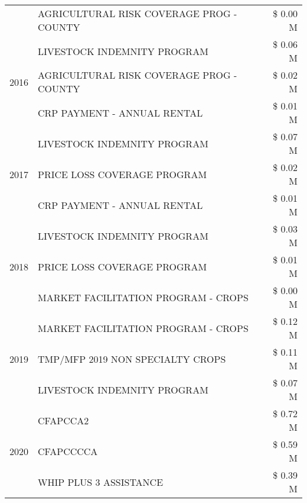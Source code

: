 \begin{tabular}{llr}
 & AGRICULTURAL RISK COVERAGE PROG - COUNTY & \$ 0.00 M \\
\cline{1-3}
\multirow[t]{3}{*}{2016} & LIVESTOCK INDEMNITY PROGRAM & \$ 0.06 M \\
 & AGRICULTURAL RISK COVERAGE PROG - COUNTY & \$ 0.02 M \\
 & CRP PAYMENT - ANNUAL RENTAL & \$ 0.01 M \\
\cline{1-3}
\multirow[t]{3}{*}{2017} & LIVESTOCK INDEMNITY PROGRAM & \$ 0.07 M \\
 & PRICE LOSS COVERAGE PROGRAM & \$ 0.02 M \\
 & CRP PAYMENT - ANNUAL RENTAL & \$ 0.01 M \\
\cline{1-3}
\multirow[t]{3}{*}{2018} & LIVESTOCK INDEMNITY PROGRAM & \$ 0.03 M \\
 & PRICE LOSS COVERAGE PROGRAM & \$ 0.01 M \\
 & MARKET FACILITATION PROGRAM - CROPS & \$ 0.00 M \\
\cline{1-3}
\multirow[t]{3}{*}{2019} & MARKET FACILITATION PROGRAM - CROPS & \$ 0.12 M \\
 & TMP/MFP 2019 NON SPECIALTY CROPS & \$ 0.11 M \\
 & LIVESTOCK INDEMNITY PROGRAM & \$ 0.07 M \\
\cline{1-3}
\multirow[t]{3}{*}{2020} & CFAPCCA2 & \$ 0.72 M \\
 & CFAPCCCCA & \$ 0.59 M \\
 & WHIP PLUS 3 ASSISTANCE & \$ 0.39 M \\
\cline{1-3}
\bottomrule
\end{tabular}
